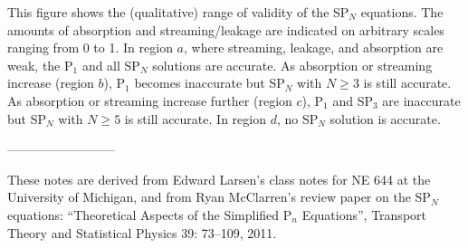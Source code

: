 \documentclass[12pt]{article}
\begin{document}
This figure shows the (qualitative) range of validity of the SP$_N$ equations.
The amounts of absorption and streaming/leakage are indicated on arbitrary scales ranging from 0 to 1.
In region $a$, where streaming, leakage, and absorption are weak, the P$_1$ and all SP$_N$ solutions are accurate.
As absorption or streaming increase (region $b$), P$_1$ becomes inaccurate but SP$_N$ with $N \geq 3$ is still accurate.
As absorption or streaming increase further (region $c$), P$_1$ and SP$_3$ are inaccurate but SP$_N$ with $N \geq 5$ is still accurate.
In region $d$, no SP$_N$ solution is accurate.

--------------------------

\vfill

These notes are derived from Edward Larsen's class notes for NE 644 at the University of Michigan, and from Ryan McClarren's review paper on the SP$_N$ equations: ``Theoretical Aspects of the Simplified P$_n$ Equations'', Transport Theory and Statistical Physics 39: 73--109, 2011.
\end{document}

